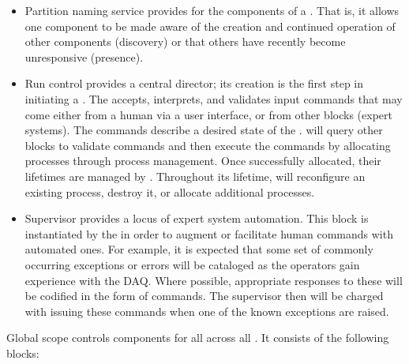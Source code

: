 \begin{itemize}
\item Partition naming service provides  for the components of
  a . 
  That is, it allows one component to be made aware of the creation and
  continued operation of other components (discovery) or that others have
  recently become unresponsive (presence). 

\item Run control provides a central director; its creation is the first step in
  initiating a . 
  The  accepts, interprets, and validates input commands that may come
  either from a human via a user interface, or from other blocks (expert
  systems). 
  The commands describe a desired state of the . 
   will query other blocks to validate commands and then execute the
  commands by allocating processes through process management. 
  Once successfully allocated, their lifetimes are managed by . 
  Throughout its lifetime,  will reconfigure an existing process,
  destroy it, or allocate additional processes. 

\item Supervisor provides a locus of expert system automation. 
  This block is instantiated by the  in order to augment or facilitate
  human commands with automated ones. 
  For example, it is expected that some set of commonly occurring exceptions or
  errors will be cataloged as the operators gain experience with the DAQ. 
  Where possible, appropriate responses to these will be codified in the form of
   commands. 
  The supervisor then will be charged with issuing these commands when one of
  the known exceptions are raised.

\end{itemize}

Global scope controls  components for all  across all
. 
It consists of the following blocks:


